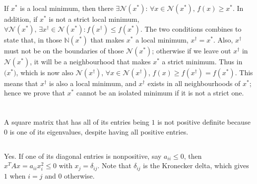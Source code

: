 \documentclass[11pt]{article}
\begin{document}
\section{}
If $x^*$ is a local minimum, then there $\exists\mathcal{N}(x^*):\,\forall x \in\mathcal{N}(x^*),\,f(x)\geq x^*$. In addition, if $x^*$ is not a strict local minimum, $\forall \mathcal{N}(x^*),\,\exists x^\dagger\in\mathcal{N}(x^*):f(x^\dagger)\leq f(x^*) $. The two conditions combines to state that, in those $\mathbb{N}(x^*)$ that makes $x^*$ a local minimum, $x^\dagger=x^*$. Also, $x^\dagger$ must not be on the boundaries of those $\mathcal{N}(x^*)$; otherwise if we leave out $x^\dagger$ in $\mathcal{N}(x^*)$, it will be a neighbourhood that makes $x^*$ a strict minimum. Thus in $\mathcal(x^*)$, which is now also $\mathcal{N}(x^\dagger)$, $\forall x\in\mathcal{N}(x^\dagger)$, $f(x) \geq f(x^\dagger)=f(x^*)$. This means that $x^\dagger$ is also a local minimum, and $x^\dagger$ exists in all neighbourhoods of $x^*$; hence we prove that $x^*$ cannot be an isolated minimum if it is not a strict one.

\section{}
\subsection{}
A square matrix that has all of its entries being $1$ is not positive definite because $0$ is one of its eigenvalues, despite having all positive entries.
\subsection{}
Yes. If one of its diagonal entries is nonpositive, say $a_{ii}\leq0$, then $x^TAx=a_{ii}x_i^2\leq0$ with $x_j=\delta_{ij}$. Note that $\delta_{ij}$ is the Kronecker delta, which gives $1$ when $i=j$ and $0$ otherwise.
\end{document}

